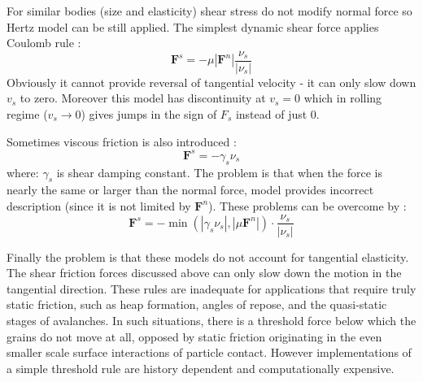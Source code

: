 \documentclass[10pt,a4paper]{article}
\begin{document}
For similar bodies (size and elasticity) shear stress do not modify normal force so Hertz model can be still applied. 
The simplest dynamic shear force applies Coulomb rule \cite{haff86}:
\begin{equation}
 \mathbf{F}^s = -\mu |\mathbf{F}^n| \frac{\nu_s}{|\nu_s|}
\end{equation}
Obviously it cannot provide reversal of tangential velocity - it can only slow down $v_s$ to zero.
Moreover this model has discontinuity at $v_s = 0$ which in rolling regime ($v_s \rightarrow 0$) gives jumps in the sign of 
$F_s$ instead of just 0.

Sometimes viscous friction is also introduced \cite{sok92b}:
\begin{equation}
 \mathbf{F}^s = -\gamma_s \nu_s
\end{equation}
where: $\gamma_s$ is shear damping constant. %
The problem is that when the force is nearly the same or larger than the normal force,
model provides incorrect description (since it is not limited by $\mathbf{F}^n$).
These problems can be overcome by \cite{pb93, pb94, pb95}:
\begin{equation} \label{eq:stat1}
 \mathbf{F}^s = -\min(|\gamma_s \nu_s|,|\mu \mathbf{F}^n|) \cdot \frac{\nu_s}{|\nu_s|}
\end{equation}

Finally the problem is that these models do not account for tangential elasticity. 
The shear friction forces discussed above can only slow down the motion in the tangential direction.
These rules are inadequate for applications that require truly static friction, such as heap formation, angles of repose, and
the quasi-static stages of avalanches.  In such situations, there is a threshold force below which the grains do not move at  all, 
opposed by static friction originating in the even smaller scale surface interactions of particle contact. 
However implementations of a simple threshold rule are history dependent and computationally expensive. 
\end{document}
